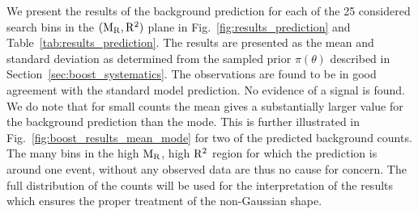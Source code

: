 We present the results of the background prediction for each of the 25 considered search bins in the
$(\mathrm{M_R},\mathrm{R^2})$ plane in Fig.~\ref{fig:results_prediction} and Table~\ref{tab:results_prediction}. The
results are presented as the mean and standard deviation as determined from the sampled prior
$\pi(\theta)$ described in Section~\ref{sec:boost_systematics}.  
The observations are found to be in good agreement with the standard model prediction. 
No evidence of a signal is found.
We do note that for small counts the mean gives a substantially larger value for the background
prediction than the mode. This is further illustrated in Fig.~\ref{fig:boost_results_mean_mode} for
two of the predicted background counts. 
The many bins in the high $\mathrm{M_R}$, high $\mathrm{R^2}$ region for which the prediction is around one event,
without any observed data are thus no cause for concern.
The full distribution of the counts will be used for the interpretation of the results which
ensures the proper treatment of the non-Gaussian shape.

